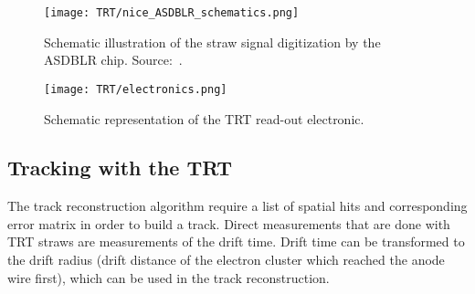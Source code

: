 \begin{figure}
\centering
\texttt{[image: TRT/nice\_ASDBLR\_schematics.png]}
\caption{ 
 Schematic illustration of the straw signal digitization by the ASDBLR chip. Source:~\cite{Aad:2008zzm}.
}
\label{fig:nice_asdblr_schematics}
\end{figure}


\begin{figure}
\centering
\texttt{[image: TRT/electronics.png]}
\caption{ 
 Schematic representation of the TRT read-out electronic.
}
\label{fig:electronics}
\end{figure}



\subsection{Tracking with the TRT}

The track reconstruction algorithm require a list of spatial hits and corresponding error matrix in order to build a track.
Direct measurements that are done with TRT straws are measurements of the drift time. Drift time can be transformed to the
drift radius (drift distance of the electron cluster which reached the anode wire first), which can be used in the track reconstruction.


